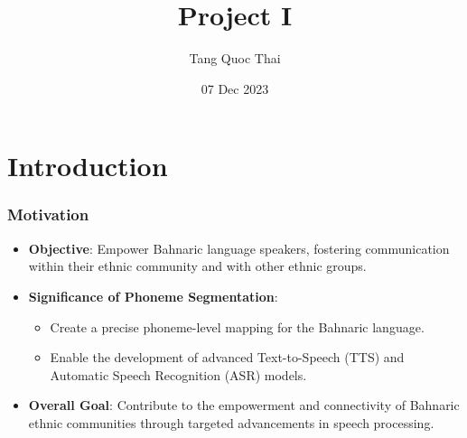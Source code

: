 \documentclass{beamer}
\title[Project I]{Project I} %
\author[Tang Quoc Thai]{\texorpdfstring{{\normalsize Tang Quoc Thai}}{Author}}
\institute[2270376] %
{

{\small Supervisor: Assoc.\ Prof.\ Quan Thanh Tho}\\
\medskip
{\small Bahnaric Phoneme Segmentation}\\
\vspace{2cm}
\medskip
Ho Chi Minh City\\
University of Technology %

}
\date{07 Dec 2023} %
\begin{document}

\begin{frame}
\titlepage%
\end{frame}



\section{Introduction}
\begin{frame}[allowframebreaks]
\frametitle{Motivation}
  \begin{itemize}
    \item \textbf{Objective}: Empower Bahnaric language speakers, fostering communication within their ethnic community and with other ethnic groups.
    \item \textbf{Significance of Phoneme Segmentation}:
    \begin{itemize}
      \item Create a precise phoneme-level mapping for the Bahnaric language.
      \item Enable the development of advanced Text-to-Speech (TTS) and Automatic Speech Recognition (ASR) models.
    \end{itemize}
    \item \textbf{Overall Goal}: Contribute to the empowerment and connectivity of Bahnaric ethnic communities through targeted advancements in speech processing.
  \end{itemize}
\end{frame}
\end{document}

